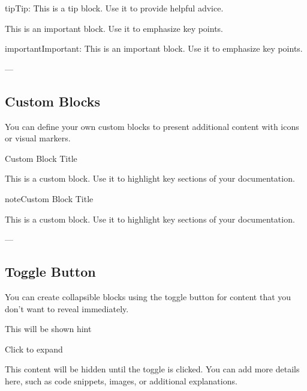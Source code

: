 \documentclass[a4paper,10pt,english]{sphinxmanual}
\begin{document}
\begin{sphinxadmonition}{tip}{Tip:}
\sphinxAtStartPar
This is a tip block. Use it to provide helpful advice.
\end{sphinxadmonition}

\begin{sphinxVerbatim}[commandchars=\\\{\}]
 
    This is an important block. Use it to emphasize key points.
\end{sphinxVerbatim}

\begin{sphinxadmonition}{important}{Important:}
\sphinxAtStartPar
This is an important block. Use it to emphasize key points.
\end{sphinxadmonition}

\sphinxAtStartPar
—


\subsection{Custom Blocks}
\label{\detokenize{page_two:custom-blocks}}
\sphinxAtStartPar
You can define your own custom blocks to present additional content with icons or visual markers.

\begin{sphinxVerbatim}[commandchars=\\\{\}]
  Custom Block Title

    This is a custom block. Use it to highlight key sections of your documentation.
\end{sphinxVerbatim}

\begin{sphinxadmonition}{note}{Custom Block Title}

\sphinxAtStartPar
This is a custom block. Use it to highlight key sections of your documentation.
\end{sphinxadmonition}

\sphinxAtStartPar
—


\subsection{Toggle Button}
\label{\detokenize{page_two:toggle-button}}
\sphinxAtStartPar
You can create collapsible blocks using the toggle button for content that you don’t want to reveal immediately.

\begin{sphinxVerbatim}[commandchars=\\\{\}]
  This will be shown
   hint

  Click to expand

    This content will be hidden until the toggle is clicked. You can add more details here, such as code snippets, images, or additional explanations.
\end{sphinxVerbatim}
\end{document}
